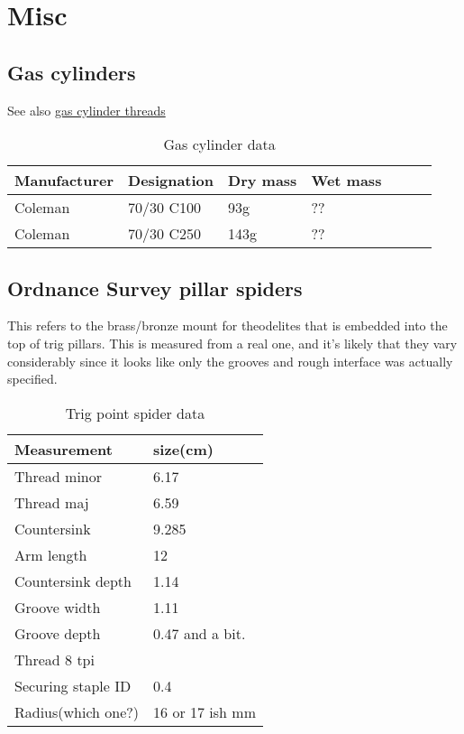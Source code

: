 \chapter{Misc}
\section{Gas cylinders} \label{gas_cylinders}


See also \hyperref[gas_cylinder_threads]{gas cylinder threads}


\begin{table}[h!]
    \footnotesize
\begin{longtable}{l|ll|ll|ll}
    Manufacturer
    &Designation
    &Dry mass
    &Wet mass
    \\
\hline
Coleman &70/30 C100 &93g &?? \\
Coleman &70/30 C250 &143g &?? \\
\end{longtable}
\caption{Gas cylinder data}
\end{table}


\section{Ordnance Survey pillar spiders} \label{gas_cylinders}
This refers to the brass/bronze mount for theodelites that is embedded into the top of trig pillars.  This is measured from a real one, and it's likely that they vary considerably since it looks like only the grooves and rough interface was actually specified.


\begin{table}[h!]
    \footnotesize
\begin{longtable}{l|l}
    Measurement
    &size(cm)
    \\
\hline
Thread minor& 6.17\\
Thread  maj& 6.59 \\
Countersink& 9.285\\
Arm length& 12\\
Countersink depth& 1.14\\
Groove width& 1.11\\
Groove depth& 0.47 and a bit.\\
Thread 8 tpi\\
Securing staple ID& 0.4\\
    Radius(which one?)&16 or 17 ish mm\\
\end{longtable}
\caption{Trig point spider data}
\end{table}








